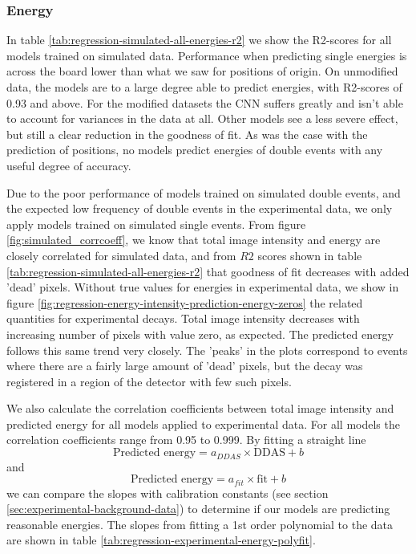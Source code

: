 \subsubsection{Energy}
In table \ref{tab:regression-simulated-all-energies-r2} we show the R2-scores for all
models trained on simulated data.
Performance when predicting single energies is across the board lower than what we saw
for positions of origin. On unmodified data, the models are to a large degree able to
predict energies, with R2-scores of 0.93 and above. For the modified datasets the CNN
suffers greatly and isn't able to account for variances in the data at all. Other models
see a less severe effect, but still a clear reduction in the goodness of fit.
As was the case with the prediction of positions, no models predict energies
of double events with any useful degree of accuracy.



Due to the poor performance of models trained on simulated double events, and the
expected low frequency of double events in the experimental data, we only apply models
trained on simulated single events. From figure \ref{fig:simulated_corrcoeff}, we know
that total image intensity and energy are closely correlated for simulated data,
and from $R2$ scores shown in table \ref{tab:regression-simulated-all-energies-r2}
that goodness of fit decreases with added 'dead' pixels. Without true values for
energies in experimental data, we show in figure \ref{fig:regression-energy-intensity-prediction-energy-zeros}
the related quantities for experimental decays. Total image intensity decreases with
increasing number of pixels with value zero, as expected. The predicted energy
follows this same trend very closely. The 'peaks' in the plots correspond to events
where there are a fairly large amount of 'dead' pixels, but the decay was registered
in a region of the detector with few such pixels.

We also calculate the correlation coefficients between total image intensity and
predicted energy for all models applied to experimental data. For all models the
correlation coefficients range from 0.95 to 0.999.
By fitting a straight line
$$\text{Predicted energy} = a_{DDAS}\times\text{DDAS} + b$$
and
$$\text{Predicted energy} = a_{fit}\times\text{fit} + b$$
we can compare the slopes with calibration constants (see section \ref{sec:experimental-background-data}) to determine if our models
are predicting reasonable energies. The slopes from fitting a 1st order polynomial to
the data are shown in table \ref{tab:regression-experimental-energy-polyfit}.


